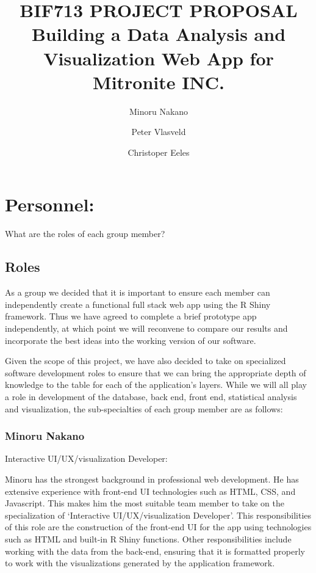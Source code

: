 \documentclass[10pt,twocolumn,letterpaper]{article}
\title{
		\usefont{OT1}{bch}{b}{n}
		\normalfont \normalsize \textsc{BIF713 PROJECT PROPOSAL} \\ [14pt]
		\huge Building a Data Analysis and Visualization Web App for Mitronite INC. \\
}
\author{Minoru Nakano}
\author{Peter Vlasveld}
\author{Christoper Eeles}
\begin{document}
\maketitle


\section{Personnel:}
    	
    	What are the roles of each group member?

            \subsection{Roles}

            As a group we decided that it is important to ensure each member can independently create a functional full stack web app using the R Shiny framework.
	    Thus we have agreed to complete a brief prototype app independently, at which point we will reconvene to compare our results and incorporate the best
	    ideas into the working version of our software.

            Given the scope of this project, we have also decided to take on specialized software development roles to ensure that we can bring the appropriate depth
	    of knowledge to the table for each of the application's layers.
	    While we will all play a role in development of the database, back end, front end, statistical analysis and visualization, the sub-specialties of each group
	    member are as follows:

                \subsubsection*{Minoru Nakano}

                Interactive UI/UX/visualization Developer:

		Minoru has the strongest background in professional web development.
		He has extensive experience with front-end UI technologies such as HTML, CSS, and Javascript.
		This makes him the most suitable team member to take on the specialization of `Interactive UI/UX/visualization Developer'.
		This responsibilities of this role are the construction of the front-end UI for the app using technologies such as HTML and built-in R Shiny functions.
		Other responsibilities include working with the data from the back-end, ensuring that it is formatted properly to work with the visualizations generated
		by the application framework.
\end{document}

